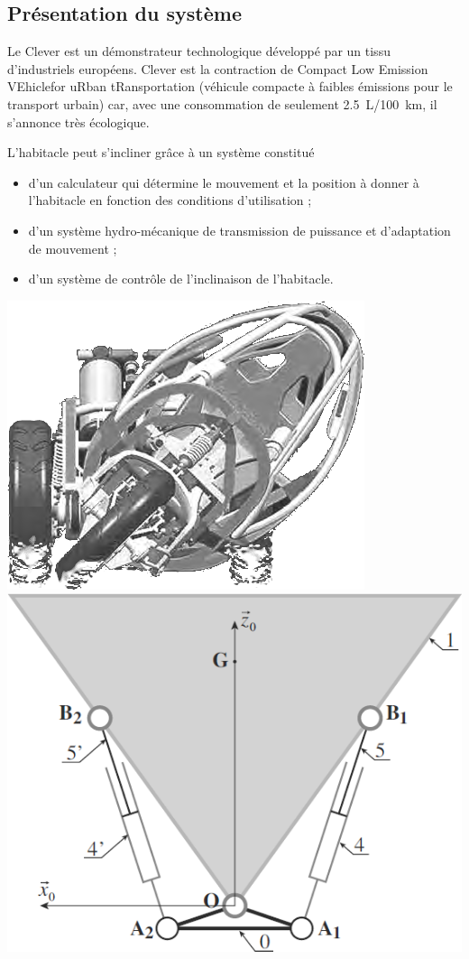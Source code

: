 \documentclass[10pt,fleqn]{article} %
\begin{document}

\vspace{4.5cm}
\pagestyle{fancy}
\thispagestyle{plain}

\def\columnseprulecolor{\color{ocre}}
\setlength{\columnseprule}{0.4pt} 

\def\pathfig{images}

\begin{multicols}{2}



\section*{Présentation du système}

Le Clever est un démonstrateur technologique développé par un tissu d'industriels européens. Clever est la contraction de Compact Low Emission VEhiclefor uRban tRansportation (véhicule compacte à faibles émissions pour le transport urbain) car, avec une consommation de seulement \SI{2,5}{L}/\SI{100}{km}, il s'annonce très écologique. 

L'habitacle peut s'incliner grâce à un système constitué 
\begin{itemize}
\item d'un calculateur qui détermine le mouvement et la position à donner à l'habitacle en fonction des conditions d'utilisation ;
\item d'un système hydro-mécanique de transmission de puissance et d'adaptation de mouvement ;
\item d'un système de contrôle de l'inclinaison de l'habitacle.
\end{itemize}

\begin{center}
\includegraphics[width=.47\linewidth]{images/fig_02}
\includegraphics[width=.47\linewidth]{images/fig_03}
\end{center}


\end{multicols}
\end{document}
